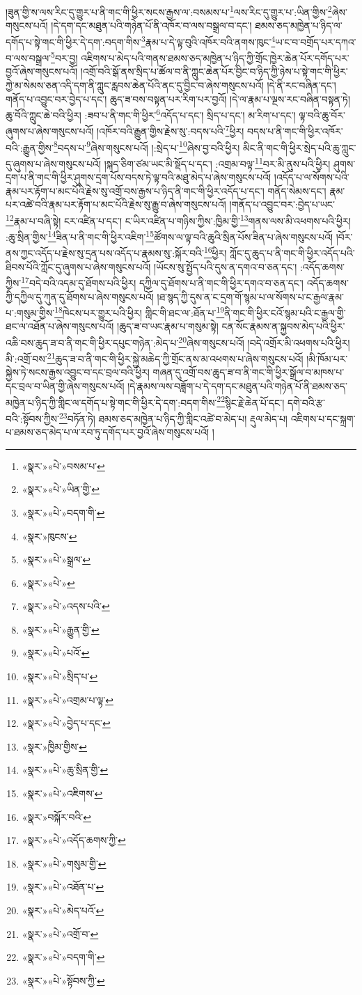 །ཟུན་གྱི་ས་ལས་རིང་དུ་གྱུར་པ་ནི་གང་གི་ཕྱིར་སངས་རྒྱས་ལ་:བསམས་པ་\footnote{«སྣར་»«པེ་»བསམ་པ་}ལས་རིང་དུ་གྱུར་པ་:ཡིན་གྱིས་\footnote{«སྣར་»«པེ་»ཡིན་གྱི་}ཞེས་གསུངས་པའོ། །དེ་དག་དང་མཐུན་པའི་གཉེན་པོ་ནི་འཁོར་བ་ལས་བསྒྲལ་བ་དང་། ཐམས་ཅད་མཁྱེན་པ་ཉིད་ལ་དགོད་པ་སྟེ་གང་གི་ཕྱིར་དེ་དག་:བདག་གིས་\footnote{«སྣར་»«པེ་»བདག་གི་}རྣམ་པ་དེ་ལྟ་བུའི་འཁོར་བའི་ནགས་ཁུང་\footnote{«སྣར་»ཁུངས་}ཡ་ང་བ་བགྲོད་པར་དཀའ་བ་ལས་བསྒྲལ་\footnote{«སྣར་»«པེ་»སྒྲལ་}བར་བྱ། འཇིགས་པ་མེད་པའི་གནས་ཐམས་ཅད་མཁྱེན་པ་ཉིད་ཀྱི་གྲོང་ཁྱེར་ཆེན་པོར་དགོད་པར་བྱའོ་ཞེས་གསུངས་པའོ། །འགྲོ་བའི་སྒོ་ནས་སྲིད་པ་ཚོལ་བ་ནི་ཀླུང་ཆེན་པོར་བྱིང་བ་ཉིད་ཀྱི་ཉེས་པ་སྟེ་གང་གི་ཕྱིར་ཀྱེ་མ་སེམས་ཅན་འདི་དག་ནི་ཀླུང་རླབས་ཆེན་པོའི་ནང་དུ་བྱིང་བ་ཞེས་གསུངས་པའོ། །དེ་ནི་རང་བཞིན་དང་། གནོད་པ་འབྱུང་བར་བྱེད་པ་དང་། ཆུད་ཟ་བས་བསྟན་པར་རིག་པར་བྱའོ། །དེ་ལ་རྣམ་པ་ལྔས་རང་བཞིན་བསྟན་ཏེ། ཆུ་བོའི་ཀླུང་ཆེ་བའི་ཕྱིར། :ཟབ་པ་ནི་གང་གི་ཕྱིར་\footnote{«སྣར་»«པེ་»}འདོད་པ་དང་། སྲིད་པ་དང་། མ་རིག་པ་དང་། ལྟ་བའི་ཆུ་བོར་ཞུགས་པ་ཞེས་གསུངས་པའོ། །འཁོར་བའི་རྒྱུན་གྱིས་རྗེས་སུ་:བདས་པའི་\footnote{«སྣར་»«པེ་»འདས་པའི་}ཕྱིར། བདས་པ་ནི་གང་གི་ཕྱིར་འཁོར་བའི་:རྒྱུན་གྱིས་\footnote{«སྣར་»«པེ་»རྒྱུན་གྱི་}བདས་པ་\footnote{«སྣར་»«པེ་»པའོ་}ཞེས་གསུངས་པའོ། །:སྲེད་པ་\footnote{«སྣར་»«པེ་»སྲིད་པ་}ཞེས་བྱ་བའི་ཕྱིར། མིང་ནི་གང་གི་ཕྱིར་སྲེད་པའི་ཆུ་ཀླུང་དུ་ཞུགས་པ་ཞེས་གསུངས་པའོ། །སྐད་ཅིག་ཙམ་ཡང་མི་སྡོད་པ་དང་། :འགྲམ་བལྟ་\footnote{«སྣར་»«པེ་»འགྲམ་པ་ལྟ་}བར་མི་ནུས་པའི་ཕྱིར། ཤུགས་དྲག་པ་ནི་གང་གི་ཕྱིར་ཤུགས་དྲག་པོས་བདས་ཏེ་ལྟ་བའི་མཐུ་མེད་པ་ཞེས་གསུངས་པའོ། །འདོད་པ་ལ་སོགས་པའི་རྣམ་པར་རྟོག་པ་མང་པོའི་རྗེས་སུ་འགྲོ་བས་རྒྱས་པ་ཉིད་ནི་གང་གི་ཕྱིར་འདོད་པ་དང་། གནོད་སེམས་དང་། རྣམ་པར་འཚེ་བའི་རྣམ་པར་རྟོག་པ་མང་པོའི་རྗེས་སུ་རྒྱུ་བ་ཞེས་གསུངས་པའོ། །གནོད་པ་འབྱུང་བར་:བྱེད་པ་ཡང་\footnote{«སྣར་»«པེ་»བྱེད་པ་དང་}རྣམ་པ་བཞི་སྟེ། ངར་འཛིན་པ་དང་། ང་ཡིར་འཛིན་པ་གཉིས་ཀྱིས་:ཁྱིམ་གྱི་\footnote{«སྣར་»ཁྱིམ་གྱིས་}གནས་ལས་མི་འཕགས་པའི་ཕྱིར། :ཆུ་སྲིན་གྱིས་\footnote{«སྣར་»«པེ་»ཆུ་སྲིན་གྱི་}ཟིན་པ་ནི་གང་གི་ཕྱིར་འཇིག་\footnote{«སྣར་»«པེ་»འཇིགས་}ཚོགས་ལ་ལྟ་བའི་ཆུའི་སྲིན་པོས་ཟིན་པ་ཞེས་གསུངས་པའོ། །བོར་ནས་ཀྱང་འདོད་པ་རྗེས་སུ་དྲན་པས་འདོད་པ་རྣམས་སུ་:སྐོར་བའི་\footnote{«སྣར་»བསྐོར་བའི་}ཕྱིར། ཀློང་དུ་ཆུད་པ་ནི་གང་གི་ཕྱིར་འདོད་པའི་ཐིབས་པོའི་ཀློང་དུ་ཞུགས་པ་ཞེས་གསུངས་པའོ། །ཡོངས་སུ་སྤྱོད་པའི་དུས་ན་དགའ་བ་ཅན་དང་། :འདོད་ཆགས་ཀྱིས་\footnote{«སྣར་»«པེ་»འདོད་ཆགས་ཀྱི་}བདེ་བའི་འདམ་དུ་ཐོགས་པའི་ཕྱིར། དཀྱིལ་དུ་ཐོགས་པ་ནི་གང་གི་ཕྱིར་དགའ་བ་ཅན་དང་། འདོད་ཆགས་ཀྱི་དཀྱིལ་དུ་ཀུན་དུ་ཐོགས་པ་ཞེས་གསུངས་པའོ། །ཐ་སྙད་ཀྱི་དུས་ན་ང་དྲག་གོ་སྙམ་པ་ལ་སོགས་པ་ང་རྒྱལ་རྣམ་པ་:གསུམ་གྱིས་\footnote{«སྣར་»«པེ་»གསུམ་གྱི་}ཁེངས་པར་གྱུར་པའི་ཕྱིར། གླིང་གི་ཐང་ལ་:ཐོན་པ་\footnote{«སྣར་»«པེ་»འཐོན་པ་}ནི་གང་གི་ཕྱིར་ངའོ་སྙམ་པའི་ང་རྒྱལ་གྱི་ཐང་ལ་འཐོན་པ་ཞེས་གསུངས་པའོ། །ཆུད་ཟ་བ་ཡང་རྣམ་པ་གསུམ་སྟེ། ངན་སོང་རྣམས་ན་སྐྱབས་མེད་པའི་ཕྱིར་འཆི་བས་ཆུད་ཟ་བ་ནི་གང་གི་ཕྱིར་དཔུང་གཉེན་:མེད་པ་\footnote{«སྣར་»«པེ་»མེད་པའོ་}ཞེས་གསུངས་པའོ། །བདེ་འགྲོར་མི་འཕགས་པའི་ཕྱིར། མི་:འགྲོ་བས་\footnote{«སྣར་»«པེ་»འགྲོ་བ་}ཆུད་ཟ་བ་ནི་གང་གི་ཕྱིར་སྐྱེ་མཆེད་ཀྱི་གྲོང་ནས་མ་འཕགས་པ་ཞེས་གསུངས་པའོ། །མི་ཁོམ་པར་སྐྱེས་ཏེ་སངས་རྒྱས་འབྱུང་བ་དང་བྲལ་བའི་ཕྱིར། གཞན་དུ་འགྲོ་བས་ཆུད་ཟ་བ་ནི་གང་གི་ཕྱིར་སྒྲོལ་བ་མཁས་པ་དང་བྲལ་བ་ཡིན་གྱི་ཞེས་གསུངས་པའོ། །དེ་རྣམས་ལས་བཟློག་པ་དེ་དག་དང་མཐུན་པའི་གཉེན་པོ་ནི་ཐམས་ཅད་མཁྱེན་པ་ཉིད་ཀྱི་གླིང་ལ་དགོད་པ་སྟེ་གང་གི་ཕྱིར་དེ་དག་:བདག་གིས་\footnote{«སྣར་»«པེ་»བདག་གི་}སྙིང་རྗེ་ཆེན་པོ་དང་། དགེ་བའི་རྩ་བའི་:སྟོབས་ཀྱིས་\footnote{«སྣར་»«པེ་»སྟོབས་ཀྱི་}བཏོན་ཏེ། ཐམས་ཅད་མཁྱེན་པ་ཉིད་ཀྱི་གླིང་འཚེ་བ་མེད་པ། རྡུལ་མེད་པ། འཇིགས་པ་དང་སྐྲག་པ་ཐམས་ཅད་མེད་པ་ལ་རབ་ཏུ་དགོད་པར་བྱའོ་ཞེས་གསུངས་པའོ། །
